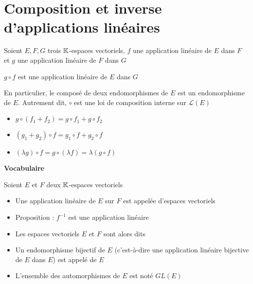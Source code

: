 \section{Composition et inverse d'applications linéaires}

\begin{frame}
Soient $E, F, G$  trois $\mathbb{K}$-espaces vectoriels, $f$ une application linéaire de $E$ dans $F$ et 
$g$ une application linéaire de $F$ dans $G$
\begin{proposition}
$g \circ f$ est une application linéaire de $E$ dans $G$
\end{proposition}

\pause

En particulier, le composé de deux endomorphismes de $E$ est un endomorphisme de $E$.
Autrement dit, $\circ$ est une loi de composition interne sur $\mathcal{L}(E)$

\pause
\bigskip

\begin{itemize}
  \item $g \circ (f_1+f_2)=g \circ f_1+ g \circ f_2$
  
  \item $(g_1+g_2) \circ f =g_1 \circ f + g_2 \circ f$
  
  \item $(\lambda g) \circ f =g \circ (\lambda f) =\lambda (g \circ f)$
\end{itemize}
\end{frame}


\begin{frame}
\textbf{Vocabulaire}

Soient $E$ et $F$ deux $\mathbb{K}$-espaces vectoriels

\begin{itemize}   
  \item Une application linéaire  de $E$ sur $F$ est appelée 
   d'espaces vectoriels
  \pause
  \item Proposition : $f^{-1}$ est une application linéaire
  \pause
  \item Les espaces vectoriels $E$ et $F$ 
  sont alors dits 
  
  \bigskip
  \pause
   
  \item Un endomorphisme bijectif de $E$ (c'est-à-dire une application linéaire bijective de $E$ dans $E$)
  est appelé  de $E$
  \pause
  \item L'ensemble des automorphismes de $E$ est noté $GL(E)$
\end{itemize}
\end{frame}

